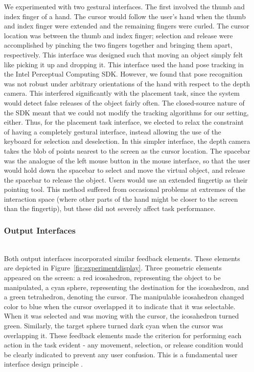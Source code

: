 \documentclass[pageno]{jpaper}
\begin{document}
We experimented with two gestural interfaces. The first involved the thumb and index finger of a hand. The cursor would
follow the user's hand when the thumb and index finger were extended and the remaining fingers were curled. The cursor
location was between the thumb and index finger; selection and release were accomplished by pinching the two fingers
together and bringing them apart, respectively. This interface was designed such that moving an object simply felt like
picking it up and dropping it. This interface used the hand pose tracking in the Intel Perceptual Computing SDK.
However, we found that pose recognition
was not robust under arbitrary orientations of the hand with respect to the depth camera. This interfered significantly with
the placement task, since the system would detect false releases of the object fairly often. The closed-source nature of the SDK meant that
we could not modify the tracking algorithms for our setting, either. Thus, for the placement task interface, we elected to
relax the constraint of having a completely gestural interface, instead allowing the use of the keyboard for selection and
deselection. In this simpler interface, the depth camera takes the blob of points nearest to the screen as the cursor location.
The spacebar was the analogue of the left mouse button in the mouse interface, so that the user would hold down the spacebar
to select and move the virtual object, and release the spacebar to release the object. Users would use an extended fingertip as
their pointing tool. This method suffered from occasional problems at extremes of the interaction space (where other parts of the hand
might be closer to the screen than the fingertip), but these did not severely affect task performance.

\subsubsection{Output Interfaces}$ $\\
Both output interfaces incorporated similar feedback elements. These elements are depicted in
Figure~\ref{fig:experimentdisplay}. Three geometric elements
appeared on the screen: a red icosahedron, representing the object to be manipulated, a
cyan sphere, representing the destination for the icosahedron, and a green tetrahedron,
denoting the cursor. The manipulable icosahedron changed color to blue when the cursor
overlapped it to indicate that it was selectable. When it was selected and was moving
with the cursor, the icosahedron turned green. Similarly, the target sphere turned dark
cyan when the cursor was overlapping it. These feedback elements made the criterion for
performing each action in the task evident -
any movement, selection, or release condition would be clearly indicated to prevent any user
confusion. This is a fundamental user interface design principle \cite{bravenuiworld}.
\end{document}
